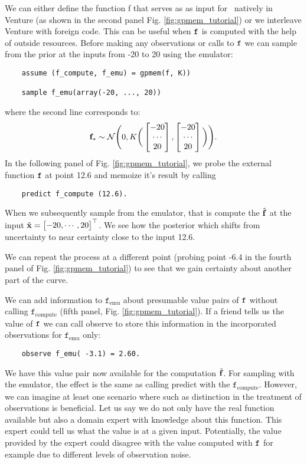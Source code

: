 We can either define the function f that serves as as input for \gpmem\
 natively in Venture
(as shown in the second panel Fig. \ref{fig:gpmem_tutorial}) or we interleave Venture with foreign code. 
This can be useful when $\texttt{f}$ is computed with the help of outside resources.
Before making any observations or calls to $\texttt{f}$
we can sample from the prior at the inputs from -20 to 20 using the emulator:
    \begin{lstlisting}
    assume (f_compute, f_emu) = gpmem(f, K))

    sample f_emu(array(-20, ..., 20))
    \end{lstlisting}
where the second line corresponds to:
\[ 
\mathbf{f}_* \sim \mathcal{N}\Bigg(0,K\bigg(
\begin{bmatrix} 
-20 \\
\cdots \\
20
 \end{bmatrix},
\begin{bmatrix} 
-20 \\
\cdots \\
20
 \end{bmatrix}
\bigg)
\Bigg).
\]
In the following panel of Fig. \ref{fig:gpmem_tutorial}, we probe the external function $\texttt{f}$ at point 12.6 and memoize it's result by calling 
   \begin{lstlisting}
    predict f_compute (12.6).
    \end{lstlisting}
When we subsequently sample from the emulator, that is compute the $\hat{\mathbf{f}}$ at the input
$\hat{\mathbf{x}}= \begin{bmatrix} -20, \cdots, 20 \end{bmatrix}^\top$. We see how the posterior which shifts from uncertainty to near certainty close to the input 12.6.

We can repeat the process at a different point (probing point -6.4 in the fourth panel of Fig. \ref{fig:gpmem_tutorial}) to see that we gain certainty about another part of the curve. 

We can add information to $\texttt{f}_\text{emu}$ about presumable value pairs of $\texttt{f}$ without calling $\texttt{f}_\text{compute}$
(fifth panel, Fig. \ref{fig:gpmem_tutorial}).
If a friend tells us the value of $\texttt{f}$ we can call observe to store this information in the incorporated observations for $\texttt{f}_\text{emu}$ only:
    \begin{lstlisting}
    observe f_emu( -3.1) = 2.60.
    \end{lstlisting}
We have this value pair now available for the computation $\hat{\mathbf{f}}$. 
For sampling with the emulator, the effect is the same as calling predict with the $\texttt{f}_\text{compute}$.
However, we can imagine at least one scenario where such as distinction in the treatment of observations 
is beneficial. Let us say we do not only have the real function available but also a domain expert with knowledge 
about this function.
This expert could tell us what the value is at a given input.
Potentially, the value provided by the expert could disagree with the value computed with $\texttt{f}$ for example 
due to different levels of observation noise. 

